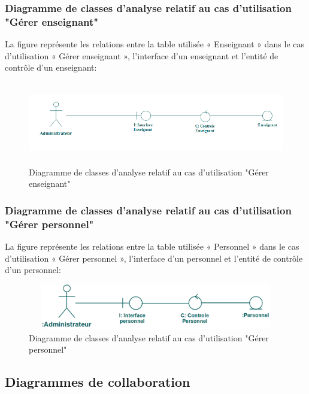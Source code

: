 \documentclass[12 pt ]{report}
\begin{document}
\subsubsection{Diagramme de classes d’analyse relatif au cas d’utilisation "Gérer enseignant" }
La figure  représente les relations entre la table utilisée « Enseignant » dans le cas d’utilisation « Gérer enseignant », l’interface d'un enseignant et  l'entité de  contrôle d'un enseignant:
\begin{figure}[h]
\begin{center}
\includegraphics[width= 12cm , height =3.6cm]{cl_aj.png}
\caption{Diagramme de classes d’analyse relatif au cas d’utilisation "Gérer enseignant"}
\end{center}
\end{figure}
\subsubsection{Diagramme de classes d’analyse relatif au cas d’utilisation "Gérer personnel" }
La figure  représente les relations entre la table utilisée « Personnel » dans le cas d’utilisation « Gérer personnel », l’interface d'un personnel et  l'entité de  contrôle d'un personnel:
\begin{figure}[h]
\begin{center}
\includegraphics[width= 12cm , height =2cm]{cap.png}
\caption{Diagramme de classes d’analyse relatif au cas d’utilisation "Gérer personnel"}
\end{center}
\end{figure}
\subsection{Diagrammes de collaboration }
\end{document}
